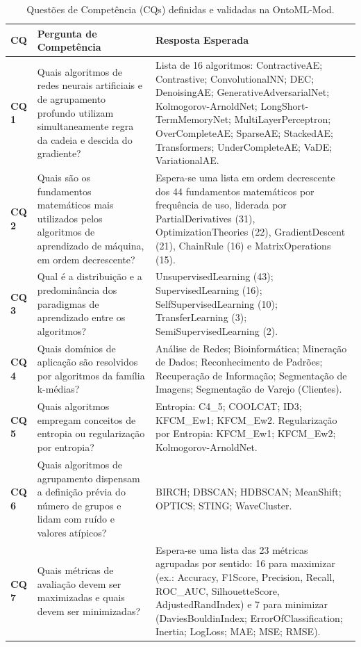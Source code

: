 \documentclass[11pt,a4paper]{article}
\begin{document}
\begin{table}[htbp]
\centering
\caption{Questões de Competência (CQs) definidas e validadas na OntoML-Mod.}
\label{tab:cqs}
\footnotesize
{\sloppy
\begin{tabularx}{\textwidth}{@{}>{\raggedright\arraybackslash}p{1.05cm}>{\raggedright\arraybackslash}p{5.75cm}>{\raggedright\arraybackslash}X@{}}
\toprule
\textbf{CQ} & \textbf{Pergunta de Competência} & \textbf{Resposta Esperada} \\
\midrule
\textbf{CQ 1} & Quais algoritmos de redes neurais artificiais e de agrupamento profundo utilizam simultaneamente regra da cadeia e descida do gradiente? & Lista de 16 algoritmos: ContractiveAE; Contrastive; ConvolutionalNN; DEC; DenoisingAE; GenerativeAdversarialNet; Kolmogorov-ArnoldNet; LongShort-TermMemoryNet; MultiLayerPerceptron; OverCompleteAE; SparseAE; StackedAE; Transformers; UnderCompleteAE; VaDE; VariationalAE. \\
\addlinespace[3pt]
\textbf{CQ 2} & Quais são os fundamentos matemáticos mais utilizados pelos algoritmos de aprendizado de máquina, em ordem decrescente? & Espera-se uma lista em ordem decrescente dos 44 fundamentos matemáticos por frequência de uso, liderada por PartialDerivatives (31), OptimizationTheories (22), GradientDescent (21), ChainRule (16) e MatrixOperations (15). \\
\addlinespace[3pt]
\textbf{CQ 3} & Qual é a distribuição e a predominância dos paradigmas de aprendizado entre os algoritmos? & UnsupervisedLearning (43); SupervisedLearning (16); SelfSupervisedLearning (10); TransferLearning (3); SemiSupervisedLearning (2). \\
\addlinespace[3pt]
\textbf{CQ 4} & Quais domínios de aplicação são resolvidos por algoritmos da família k-médias? & Análise de Redes; Bioinformática; Mineração de Dados; Reconhecimento de Padrões; Recuperação de Informação; Segmentação de Imagens; Segmentação de Varejo (Clientes). \\
\addlinespace[3pt]
\textbf{CQ 5} & Quais algoritmos empregam conceitos de entropia ou regularização por entropia? & Entropia: C4\_5; COOLCAT; ID3; KFCM\_Ew1; KFCM\_Ew2. Regularização por Entropia: KFCM\_Ew1; KFCM\_Ew2; Kolmogorov-ArnoldNet. \\
\addlinespace[3pt]
\textbf{CQ 6} & Quais algoritmos de agrupamento dispensam a definição prévia do número de grupos e lidam com ruído e valores atípicos? & BIRCH; DBSCAN; HDBSCAN; MeanShift; OPTICS; STING; WaveCluster. \\
\addlinespace[3pt]
\textbf{CQ 7} & Quais métricas de avaliação devem ser maximizadas e quais devem ser minimizadas? & Espera-se uma lista das 23 métricas agrupadas por sentido: 16 para maximizar (ex.: Accuracy, F1Score, Precision, Recall, ROC\_AUC, SilhouetteScore, AdjustedRandIndex) e 7 para minimizar (DaviesBouldinIndex; ErrorOfClassification; Inertia; LogLoss; MAE; MSE; RMSE). \\

\end{tabularx}}
\end{table}
\end{document}
